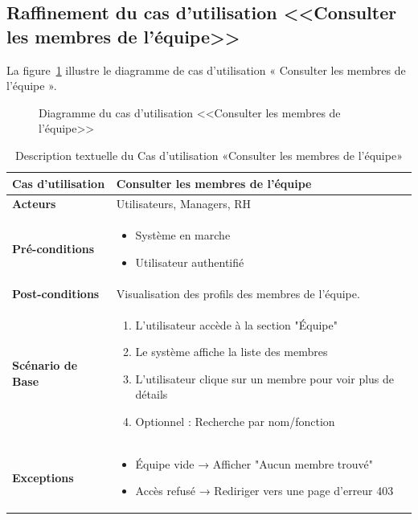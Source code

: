 \subsection{Raffinement du cas d'utilisation <<Consulter les membres de l'équipe>>}
La figure~\ref{fig:cmequipe} illustre le diagramme de cas d'utilisation « Consulter les membres de l'équipe ».
\begin{figure}[h]
     \centering
     \caption{Diagramme du cas d'utilisation <<Consulter les membres de l'équipe>>}
     \label{fig:cmequipe}
\end{figure}
\begin{table}[!ht]
    \begin{adjustwidth}{-2cm}{-2cm}
    \centering
    \caption{Description textuelle du Cas d'utilisation «Consulter les membres de l'équipe»}
    \label{tab:consult_team_members}
    \renewcommand{\arraystretch}{1.2}
    \begin{tabular}{|p{4.2cm}|p{11cm}|}
    \hline
    \textbf{Cas d'utilisation} & Consulter les membres de l'équipe \\
    \hline
    \textbf{Acteurs} & Utilisateurs, Managers, RH \\
    \hline
    \textbf{Pré-conditions} & 
    \begin{itemize}
    \item Système en marche
    \item Utilisateur authentifié
    \end{itemize} \\
    \hline
    \textbf{Post-conditions} & Visualisation des profils des membres de l'équipe. \\
    \hline
    \textbf{Scénario de Base} & 
    \begin{enumerate}
    \item L'utilisateur accède à la section "Équipe"
    \item Le système affiche la liste des membres
    \item L'utilisateur clique sur un membre pour voir plus de détails
    \item Optionnel : Recherche par nom/fonction
    \end{enumerate} \\
    \hline
    \textbf{Exceptions} & 
    \begin{itemize}
    \item Équipe vide → Afficher "Aucun membre trouvé"
    \item Accès refusé → Rediriger vers une page d'erreur 403
    \end{itemize} \\
    \hline
    \end{tabular}
    \end{adjustwidth}
    \end{table}

